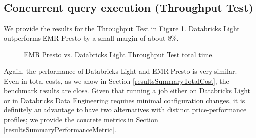 \subsection{Concurrent query execution (Throughput Test)}

We provide the results for the Throughput Test in Figure \ref{fig:prestoVsDatabricksLightTputTest}. Databricks Light outperforms EMR Presto by a small margin of about 8\%.

\begin{figure}
   \begin{center}
   \end{center}
   \caption{EMR Presto vs. Databricks Light Throughput Test total time.}
   \label{fig:prestoVsDatabricksLightTputTest}
\end{figure}

Again, the performance of Databricks Light and EMR Presto is very similar. Even in total costs, as we show in Section \ref{resultsSummaryTotalCost}, the benchmark results are close. Given that running a job either on Databricks Light or in Databricks Data Engineering requires minimal configuration changes, it is definitely an advantage to have two alternatives with distinct price-performance profiles; we provide the concrete metrics in Section \ref{resultsSummaryPerformanceMetric}.



